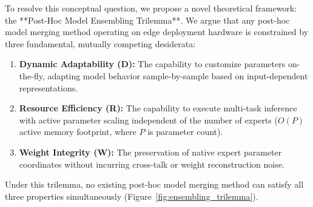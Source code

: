 To resolve this conceptual question, we propose a novel theoretical framework: the **Post-Hoc Model Ensembling Trilemma**. We argue that any post-hoc model merging method operating on edge deployment hardware is constrained by three fundamental, mutually competing desiderata:
\begin{enumerate}
\item \textbf{Dynamic Adaptability (D):} The capability to customize parameters on-the-fly, adapting model behavior sample-by-sample based on input-dependent representations.
\item \textbf{Resource Efficiency (R):} The capability to execute multi-task inference with active parameter scaling independent of the number of experts ($O(P)$ active memory footprint, where $P$ is parameter count).
\item \textbf{Weight Integrity (W):} The preservation of native expert parameter coordinates without incurring cross-talk or weight reconstruction noise.
\end{enumerate}

Under this trilemma, no existing post-hoc model merging method can satisfy all three properties simultaneously (Figure~\ref{fig:ensembling_trilemma}).

